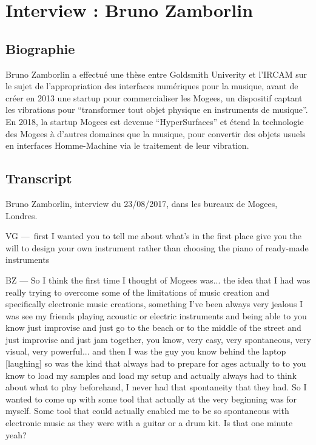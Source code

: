 \chapter{Interview : Bruno Zamborlin}
\label{appendix:zamborlin}

\section*{Biographie}
\noindent Bruno Zamborlin a effectué une thèse entre Goldsmith Univerity et l'IRCAM sur le sujet de l'appropriation des interfaces numériques pour la musique, avant de créer en 2013 une startup pour commercialiser les Mogees, un dispositif captant les vibrations pour ``transformer tout objet physique en instruments de musique''. En 2018, la startup Mogees est devenue ``HyperSurfaces'' et étend la technologie des Mogees à d'autres domaines que la musique, pour convertir des objets usuels en interfaces Homme-Machine via le traitement de leur vibration.

\section*{Transcript}

\noindent Bruno Zamborlin, interview du 23/08/2017, dans les bureaux de Mogees, Londres.

VG — first I wanted you to tell me about what's in the first place give you the will to design your own instrument rather than choosing the piano of ready-made instruments 

BZ — So I think the first time I thought of Mogees was... the idea that I had was really trying to overcome some of the limitations of music creation and specifically electronic music creations, something I've been always very jealous I was see my friends playing acoustic or electric instruments and being able to you know just improvise and just go to the beach or to the middle of the street and just improvise and just jam together, you know, very easy, very spontaneous, very visual, very powerful... and then I was the guy you know behind the laptop [laughing] so was the kind that always had to prepare for ages actually to to you know to load my samples and load my setup and actually always had to think about what to play beforehand, I never had that spontaneity that they had. So I wanted to come up with some tool that actually at the very beginning was for myself. Some tool that could actually enabled me to be so spontaneous with electronic music as they were with a guitar or a drum kit. Is that one minute yeah? 

